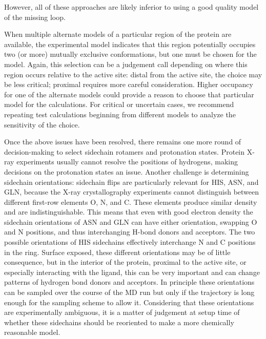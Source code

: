 \documentclass[9pt,bestpractices]{livecoms}
\begin{document}
However, all of these approaches are likely inferior to using a good quality model of the missing loop. 

When multiple alternate models of a particular region of the protein are available, the experimental model indicates that this region potentially occupies two (or more) mutually exclusive conformations, but one must be chosen for the model. Again, this selection can be a judgement call depending on where this region occurs relative to the active site: distal from the active site, the choice may be less critical; proximal requires more careful consideration. Higher occupancy for one of the alternate models could provide a reason to choose that particular model for the calculations. For critical or uncertain cases, we recommend repeating test calculations beginning from different models to analyze the sensitivity of the choice. 

Once the above issues have been resolved, there remains one more round of decision-making to select sidechain rotamers and protonation states. Protein X-ray experiments usually cannot resolve the positions of hydrogens, making decisions on the protonation states an issue. Another challenge is determining sidechain orientations: sidechain flips are particularly relevant for HIS, ASN, and GLN, because the X-ray crystallography experiments cannot distinguish between different first-row elements O, N, and C. These elements produce similar density and are indistinguishable. This means that even with good electron density the sidechain orientations of ASN and GLN can have either orientation, swapping O and N positions, and thus interchanging H-bond donors and acceptors. The two possible orientations of HIS sidechains effectively interchange N and C positions in the ring. Surface exposed, these different orientations may be of little consequence, but in the interior of the protein, proximal to the active site, or especially interacting with the ligand, this can be very important and can change patterns of hydrogen bond donors and acceptors. In principle these orientations can be sampled over the course of the MD run but only if the trajectory is long enough for the sampling scheme to allow it. Considering that these orientations are experimentally ambiguous, it is a matter of judgement at setup time of whether these sidechains should be reoriented to make a more chemically reasonable model. 
\end{document}
